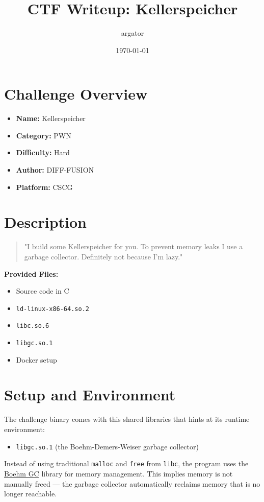 \documentclass[a4paper,11pt]{article}
\title{CTF Writeup: Kellerspeicher}
\author{argator}
\date{\today}
\begin{document}
\maketitle

\section*{Challenge Overview}
\begin{itemize}
    \item \textbf{Name:} Kellerspeicher
    \item \textbf{Category:} PWN
    \item \textbf{Difficulty:} Hard
    \item \textbf{Author:} DIFF-FUSION
    \item \textbf{Platform:} CSCG
\end{itemize}

\section{Description}
\begin{quote}
"I build some Kellerspeicher for you. To prevent memory leaks I use a garbage collector. Definitely not because I'm lazy."
\end{quote}

\noindent \textbf{Provided Files:}
\begin{itemize}
    \item Source code in C
    \item \texttt{ld-linux-x86-64.so.2}
    \item \texttt{libc.so.6}
    \item \texttt{libgc.so.1}
    \item Docker setup
\end{itemize}

\section{Setup and Environment}

The challenge binary comes with this shared libraries that hints at its runtime environment:
\begin{itemize}
    \item \texttt{libgc.so.1} (the Boehm-Demers-Weiser garbage collector)
\end{itemize}

Instead of using traditional \texttt{malloc} and \texttt{free} from \texttt{libc}, the program uses the \href{https://github.com/ivmai/bdwgc}{Boehm GC} library for memory management. This implies memory is not manually freed — the garbage collector automatically reclaims memory that is no longer reachable.
\end{document}
